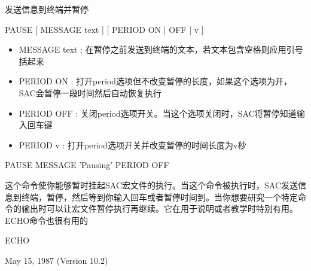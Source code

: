 \label{cmd:pause}

发送信息到终端并暂停

PAUSE [ MESSAGE text ] [ PERIOD ON | OFF | v ]

\begin{itemize}
\item MESSAGE text : 在暂停之前发送到终端的文本，若文本包含空格则应用引号括起来 
\item PERIOD ON : 打开period选项但不改变暂停的长度，如果这个选项为开，SAC会暂停一段时间然后自动恢复执行
\item PERIOD OFF : 关闭period选项开关。当这个选项关闭时，SAC将暂停知道输入回车键
\item PERIOD v : 打开period选项开关并改变暂停的时间长度为v秒
\end{itemize}

PAUSE MESSAGE 'Pausing' PERIOD OFF

这个命令使你能够暂时挂起SAC宏文件的执行。当这个命令被执行时，SAC发送信息到终端，暂停，然后等到你输入回车或者暂停时间到。当你想要研究一个特定命令的输出时可以让宏文件暂停执行再继续。它在用于说明或者教学时特别有用。ECHO命令也很有用的

ECHO

May 15, 1987 (Version 10.2)
